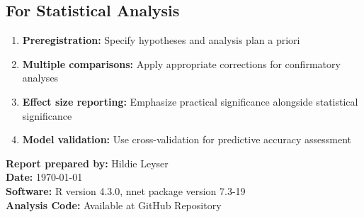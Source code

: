 \documentclass[11pt,a4paper]{article}
\begin{document}
\subsection{For Statistical Analysis}
\begin{enumerate}
    \item \textbf{Preregistration:} Specify hypotheses and analysis plan a priori
    \item \textbf{Multiple comparisons:} Apply appropriate corrections for confirmatory analyses
    \item \textbf{Effect size reporting:} Emphasize practical significance alongside statistical significance
    \item \textbf{Model validation:} Use cross-validation for predictive accuracy assessment
\end{enumerate}

\vspace{1cm}
\noindent\textbf{Report prepared by:} Hildie Leyser\\
\textbf{Date:} \today\\
\textbf{Software:} R version 4.3.0, nnet package version 7.3-19\\
\textbf{Analysis Code:} Available at GitHub Repository
\end{document}
